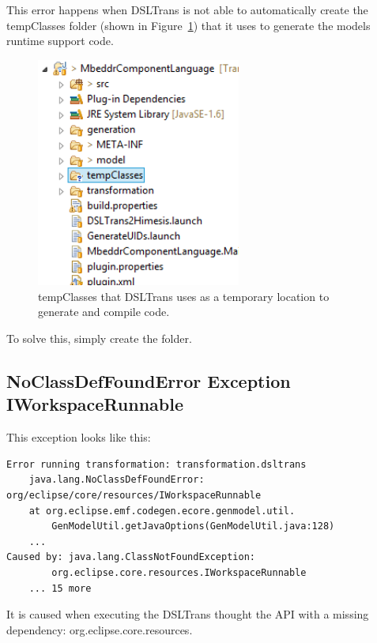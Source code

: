 This error happens when DSLTrans is not able to automatically create the
tempClasses folder (shown in Figure~\ref{fig:dsltrans_tempClasses}) that it uses
to generate the models runtime support code.

\begin{figure}[h]
\begin{center}
  \includegraphics[width=0.6\textwidth]{imgs/dsltrans_tempClasses}
  \caption{tempClasses that DSLTrans uses as a temporary location to generate and compile code.}
  \label{fig:dsltrans_tempClasses}
\end{center}
\end{figure}

To solve this, simply create the folder.


\subsection{NoClassDefFoundError Exception IWorkspaceRunnable}

This exception looks like this:

\begin{verbatim}
Error running transformation: transformation.dsltrans
	java.lang.NoClassDefFoundError: 
org/eclipse/core/resources/IWorkspaceRunnable
	at org.eclipse.emf.codegen.ecore.genmodel.util.
		GenModelUtil.getJavaOptions(GenModelUtil.java:128)
	...
Caused by: java.lang.ClassNotFoundException: 
		org.eclipse.core.resources.IWorkspaceRunnable
	... 15 more

\end{verbatim}

It is caused when executing the DSLTrans thought the API with a missing dependency: org.eclipse.core.resources.

